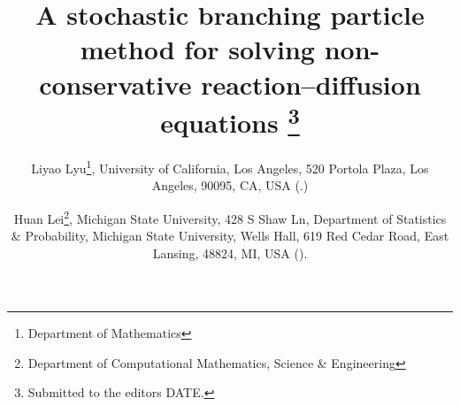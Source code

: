 

\usepackage{lipsum}
\usepackage{amsfonts}
\usepackage{graphicx}
\usepackage{epstopdf}
\ifpdf
\else
\fi

\newcommand{\creflastconjunction}{, and~}



\title{%
A stochastic branching particle method for solving non-conservative reaction--diffusion equations
\thanks{Submitted to the editors DATE.
}
}

\author{Liyao Lyu\thanks{Department of Mathematics}, {University of California, Los Angeles}, {520 Portola Plaza}, {Los Angeles}, 90095, CA, USA
  (.)
\and Huan Lei\thanks{Department of Computational Mathematics, Science \& Engineering}, {Michigan State University}, {{428 S Shaw Ln}, 
Department of Statistics \& Probability}, Michigan State University, Wells Hall, 619 Red Cedar Road, {East Lansing}, {48824}, {MI}, {USA} ().}


\usepackage{amsopn}
\DeclareMathOperator{\diag}{diag}





